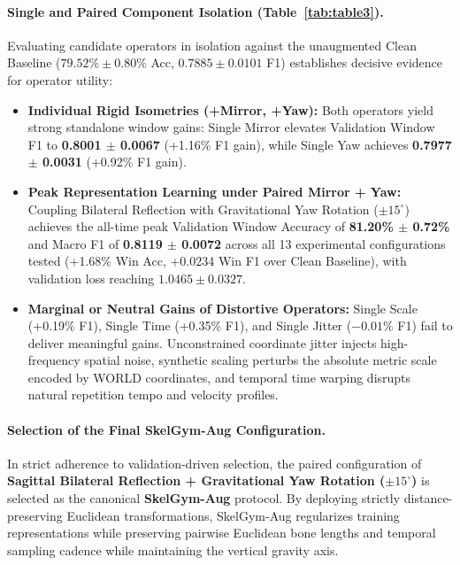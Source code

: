 \documentclass[runningheads]{llncs}
\begin{document}
\paragraph{Single and Paired Component Isolation (Table~\ref{tab:table3}).}
Evaluating candidate operators in isolation against the unaugmented Clean Baseline ($79.52\% \pm 0.80\%$ Acc, $0.7885 \pm 0.0101$ F1) establishes decisive evidence for operator utility:
\begin{itemize}
    \item \textbf{Individual Rigid Isometries (+Mirror, +Yaw):} Both operators yield strong standalone window gains: Single Mirror elevates Validation Window F1 to \textbf{0.8001 $\pm$ 0.0067} (+1.16\% F1 gain), while Single Yaw achieves \textbf{0.7977 $\pm$ 0.0031} (+0.92\% F1 gain).
    \item \textbf{Peak Representation Learning under Paired Mirror + Yaw:} Coupling Bilateral Reflection with Gravitational Yaw Rotation ($\pm 15^\circ$) achieves the all-time peak Validation Window Accuracy of \textbf{81.20\% $\pm$ 0.72\%} and Macro F1 of \textbf{0.8119 $\pm$ 0.0072} across all 13 experimental configurations tested (+1.68\% Win Acc, +0.0234 Win F1 over Clean Baseline), with validation loss reaching $1.0465 \pm 0.0327$.
    \item \textbf{Marginal or Neutral Gains of Distortive Operators:} Single Scale (+0.19\% F1), Single Time (+0.35\% F1), and Single Jitter ($-0.01\%$ F1) fail to deliver meaningful gains. Unconstrained coordinate jitter injects high-frequency spatial noise, synthetic scaling perturbs the absolute metric scale encoded by WORLD coordinates, and temporal time warping disrupts natural repetition tempo and velocity profiles.
\end{itemize}

\paragraph{Selection of the Final SkelGym-Aug Configuration.}
In strict adherence to validation-driven selection, the paired configuration of \textbf{Sagittal Bilateral Reflection + Gravitational Yaw Rotation ($\pm 15^\circ$)} is selected as the canonical \textbf{SkelGym-Aug} protocol. By deploying strictly distance-preserving Euclidean transformations, SkelGym-Aug regularizes training representations while preserving pairwise Euclidean bone lengths and temporal sampling cadence while maintaining the vertical gravity axis.
\end{document}
